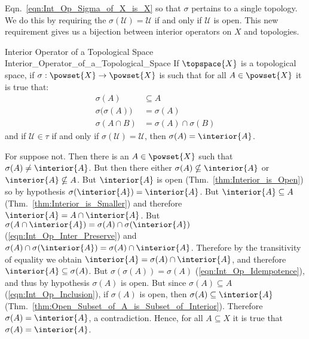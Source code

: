 \documentclass{article}                                                        %
\begin{document}
        Eqn.~\ref{eqn:Int_Op_Sigma_of_X_is_X} so that $\sigma$ pertains to a
        single topology. We do this by requiring the
        $\sigma(\mathcal{U})=\mathcal{U}$ if and only if $\mathcal{U}$ is open.
        This new requirement gives us a bijection between interior operators
        on $X$ and topologies.
        \begin{ftheorem}{Interior Operator of a Topological Space}
                        {Interior_Operator_of_a_Topological_Space}
            If $\topspace{X}$ is a topological space, if
            $\sigma:\powset{X}\rightarrow\powset{X}$ is such that for all
            $A\in\powset{X}$ it is true that:
            \begin{align}
                \label{eqn:Int_Op_Inclusion}%
                \sigma(A)&\subseteq{A}\tag{1}\\
                \label{eqn:Int_Op_Idempotence}%
                \sigma\big(\sigma(A)\big)&=\sigma(A)\tag{2}\\
                \label{eqn:Int_Op_Inter_Preserve}%
                \sigma(A\cap{B})&=\sigma(A)\cap\sigma(B)\tag{3}
            \end{align}
            and if $\mathcal{U}\in\tau$ if and only if
            $\sigma(\mathcal{U})=\mathcal{U}$, then $\sigma(A)=\interior{A}$.
        \end{ftheorem}
        \begin{bproof}
            For suppose not. Then there is an $A\in\powset{X}$ such that
            $\sigma(A)\ne\interior{A}$. But then there either
            $\sigma(A)\nsubseteq\interior{A}$ or $\interior{A}\nsubseteq{A}$.
            But $\interior{A}$ is open (Thm.~\ref{thm:Interior_is_Open}) so by
            hypothesis $\sigma(\interior{A})=\interior{A}$. But
            $\interior{A}\subseteq{A}$ (Thm.~\ref{thm:Interior_is_Smaller})
            and therefore $\interior{A}=A\cap\interior{A}$. But
            $\sigma(A\cap\interior{A})=\sigma(A)\cap\sigma(\interior{A})$
            (\ref{eqn:Int_Op_Inter_Preserve}) and
            $\sigma(A)\cap\sigma(\interior{A})=\sigma(A)\cap\interior{A}$.
            Therefore by the transitivity of equality we obtain
            $\interior{A}=\sigma(A)\cap\interior{A}$, and therefore
            $\interior{A}\subseteq\sigma(A)$. But $\sigma(\sigma(A))=\sigma(A)$
            (\ref{eqn:Int_Op_Idempotence}), and thus by hypothesis
            $\sigma(A)$ is open. But since $\sigma(A)\subseteq{A}$
            (\ref{eqn:Int_Op_Inclusion}), if $\sigma(A)$ is open, then
            $\sigma(A)\subseteq\interior{A}$
            (Thm.~\ref{thm:Open_Subset_of_A_is_Subset_of_Interior}). Therefore
            $\sigma(A)=\interior{A}$, a contradiction. Hence, for all
            $A\subseteq{X}$ it is true that $\sigma(A)=\interior{A}$.
        \end{bproof}
\end{document}
